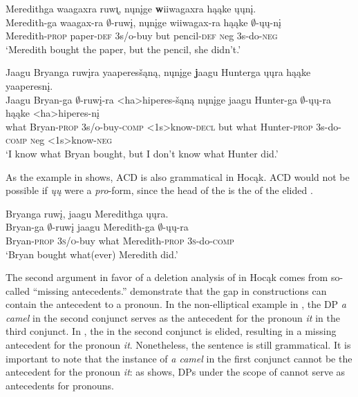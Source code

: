 \documentclass[output=paper]{LSP/langsci}
\begin{document}
\ea
\ea\label{ex:johnson:47a} 
\glll Meredithga waagaxra ruw\k{\i}, nųnįge {\textbf wiiwagaxra} hąąke ųųnį.\\
Meredith-ga waagax-ra $\emptyset$-ruwį, nųnįge wiiwagax-ra hąąke $\emptyset$-ųų-nį\\
Meredith-\textsc{prop} paper-\textsc{def} {\textsc 3s/o}-buy but pencil-\textsc{def} {\textsc neg} {\textsc 3s}-do-\textsc{neg}\\
\trans `Meredith bought the paper, but the pencil, she didn't.'
 
\ex\label{ex:johnson:47b} 
\glll Jaagu Bryanga ruwįra yaaperesšąną, nųnįge {\textbf jaagu} Hunterga ųųra hąąke yaaperesnį.\\
Jaagu Bryan-ga $\emptyset$-ruwį-ra <ha>hiperes-šąną nųnįge jaagu Hunter-ga $\emptyset$-ųų-ra hąąke <ha>hiperes-nį\\
what Bryan-\textsc{prop} {\textsc 3s/o}-buy-\textsc{comp} <{\textsc 1s}>know-\textsc{decl} but what Hunter-\textsc{prop} {\textsc 3s}-do-\textsc{comp} {\textsc neg} <{\textsc 1s}>know-\textsc{neg}\\
\trans `I know what Bryan bought, but I don't know what Hunter did.'
\z
\z

As the example in  shows, ACD is also grammatical in Hocąk. ACD would not be possible if \emph{ųų} were a \emph{pro}-form, since the head of the  is the  of the elided .
 
\ea\label{ex:johnson:48} 
\glll Bryanga ruwį, jaagu Meredithga ųųra.\\
Bryan-ga $\emptyset$-ruwį jaagu Meredith-ga $\emptyset$-ųų-ra\\
Bryan-\textsc{prop} \textsc{3s/o}-buy what Meredith-\textsc{prop} \textsc{3s}-do-\textsc{comp}\\
\trans `Bryan bought what(ever) Meredith did.'
\z

The second argument in favor of a deletion analysis of  in Hocąk comes from so-called ``missing antecedents.'' \citet{HankamerSag1976} demonstrate that the gap in   constructions can contain the antecedent to a pronoun. In the non-elliptical example in , the DP \emph{a camel} in the second conjunct serves as the antecedent for the pronoun \emph{it} in the third conjunct. In , the  in the second conjunct is elided, resulting in a missing antecedent for the pronoun \emph{it}. Nonetheless, the sentence is still grammatical. It is important to note that the instance of \emph{a camel} in the first conjunct cannot be the antecedent for the pronoun \emph{it}: as  shows, DPs under the scope of  cannot serve as antecedents for pronouns.
\end{document}
